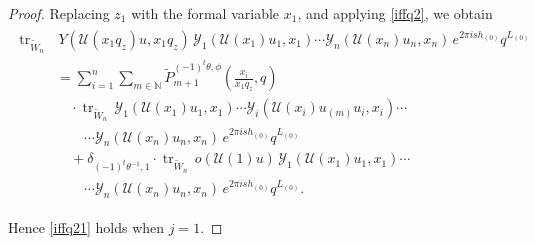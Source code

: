 \documentclass[9pt]{amsart}
\begin{document}
\begin{proof}
\noindent Replacing \( z_1 \) with the formal variable \( x_1 \), and applying \eqref{iffq2}, we obtain
\begin{align}\label{iffq25}
\begin{split}
\operatorname{tr}_{\tilde{W}_n} &\,
Y(\mathcal{U}(x_1 q_z) u, x_1 q_z)\,
\mathcal{Y}_1(\mathcal{U}(x_1) u_1, x_1) \cdots
\mathcal{Y}_n(\mathcal{U}(x_n) u_n, x_n)\,
e^{2\pi i s h_{(0)}} q^{L_{(0)}} \\
&= \sum_{i=1}^n \sum_{m \in \mathbb{N}}
\tilde{P}_{m+1}^{(-1)^t \theta, \phi}
\left( \frac{x_i}{x_1 q_z}, q \right) \\
&\quad \cdot \operatorname{tr}_{\tilde{W}_n}\,
\mathcal{Y}_1(\mathcal{U}(x_1) u_1, x_1) \cdots
\mathcal{Y}_i(\mathcal{U}(x_i) u_{(m)} u_i, x_i) \cdots \\
&\quad\quad \cdots \mathcal{Y}_n(\mathcal{U}(x_n) u_n, x_n)\,
e^{2\pi i s h_{(0)}} q^{L_{(0)}} \\
&\quad + \delta_{(-1)^t \theta^{-1}, 1} \cdot
\operatorname{tr}_{\tilde{W}_n}\,
o(\mathcal{U}(1) u)\,
\mathcal{Y}_1(\mathcal{U}(x_1) u_1, x_1) \cdots \\
&\quad\quad \cdots \mathcal{Y}_n(\mathcal{U}(x_n) u_n, x_n)\,
e^{2\pi i s h_{(0)}} q^{L_{(0)}}.
\end{split}
\end{align}

\noindent Hence \eqref{iffq21} holds when \( j=1 \).


\end{proof}
\end{document}
